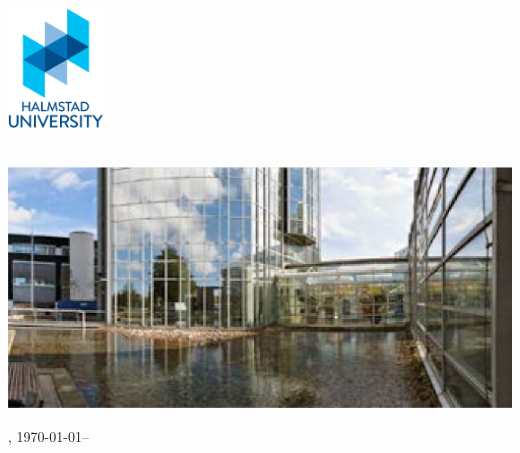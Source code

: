 \begin{titlepage}

\begin{minipage}[t][\textheight]{.25\textwidth}
	\includegraphics[width=95px]{./gfx/HHlogo.jpg}\\\\

	\centering
	\hspace{-30px}
\end{minipage}
\begin{minipage}[t][.8\textheight]{.7\textwidth}
	\raggedright
	\vspace{-80pt}
	\myDegree

	\vspace{113px}
	\includegraphics[width=\textwidth]{./gfx/HHpicture.png}

	\vspace{1cm}
	{\Large \myTitle}

	\vspace{1cm}
	{\large \mySubtitle}
	\vfill
	{\Large \myName}

	\vfill

	\myDepartment

	\vspace{1.5cm}
	\myUni, \today --\myVersion
\end{minipage}
\end{titlepage}
